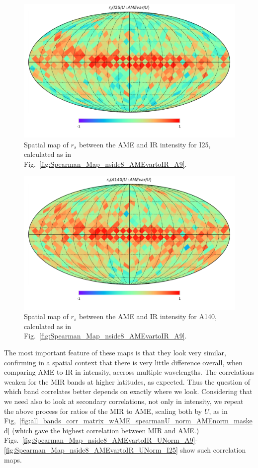       \begin{figure}
        \includegraphics[width=\textwidth/2]{../Plots/Allsky_Corr/Spearman_Map_nside8_I25toAMEvar.pdf}
        \centering
        \caption{Spatial map of $r_{s}$ between the AME and IR intensity for I25, calculated as in Fig.~\ref{fig:Spearman_Map_nside8_AMEvartoIR_A9}.}
        \label{fig:Spearman_Map_nside8_AMEvartoIR_I25}
      \end{figure}
      \begin{figure}
        \includegraphics[width=\textwidth/2]{../Plots/Allsky_Corr/Spearman_Map_nside8_A140toAMEvar.pdf}
        \centering
        \caption{Spatial map of $r_{s}$ between the AME and IR intensity for A140, calculated as in Fig.~\ref{fig:Spearman_Map_nside8_AMEvartoIR_A9}.}
        \label{fig:Spearman_Map_nside8_AMEvartoIR_A140}
      \end{figure}
  The most important feature of these maps is that they look very similar, confirming in a spatial context that there is very little difference overall, when comparing AME to IR in intensity, accross multiple wavelengths. The correlations weaken for the MIR bands at higher latitudes, as expected. Thus the question of which band correlates better depends on exactly where we look. Considering that we need also to look at secondary correlations, not only in intensity, we repeat the above process for ratios of the MIR to AME, scaling both by $U$, as in Fig,~\ref{fig:all_bands_corr_matrix_wAME_spearmanU_norm_AMEnorm_masked} (which gave the highest correlation between MIR and AME.) Figs.~\ref{fig:Spearman_Map_nside8_AMEvartoIR_UNorm_A9}-\ref{fig:Spearman_Map_nside8_AMEvartoIR_UNorm_I25} show such correlation maps.
